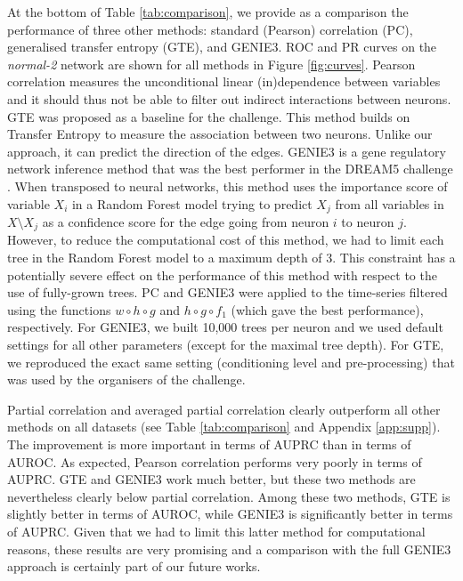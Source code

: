 \documentclass[wcp]{jmlr}
\begin{document}
At the bottom of Table \ref{tab:comparison}, we provide as a comparison the
performance of three other methods: standard (Pearson) correlation (PC),
generalised transfer entropy (GTE), and GENIE3. ROC and PR curves on the
\textit{normal-2} network are shown for all methods in Figure
\ref{fig:curves}. Pearson correlation measures the unconditional linear
(in)dependence between variables and it should thus not be able to filter out
indirect interactions between neurons. GTE \citep{stetter2012model} was
proposed as a baseline for the challenge. This method builds on Transfer
Entropy to measure the association between two neurons. Unlike our approach, it
can predict the direction of the edges. GENIE3 \citep{huynhthu2010inferring} is
a gene regulatory network inference method that was the best performer in the
DREAM5 challenge \citep{marbach2012}. When transposed to neural networks, this
method uses the importance score of variable $X_i$ in a Random Forest model trying to
predict $X_j$ from all variables in $X\setminus X_j$ as a confidence score for the edge going from neuron $i$ to neuron
$j$. However, to reduce the
computational cost of this method, we had to limit each tree in the
Random Forest model to a maximum depth of 3. This constraint has a potentially
severe effect on the performance of this method with respect to the use of
fully-grown trees. PC and GENIE3 were applied to the time-series filtered using the functions $w\circ h\circ g$ and $h\circ g\circ f_1$ (which
gave the best performance), respectively. For GENIE3, we built 10,000 trees per neuron and we
used default settings for all other parameters (except for the maximal tree
depth). For GTE, we reproduced the exact same setting (conditioning level and
pre-processing) that was used by the organisers of the challenge.


Partial correlation and averaged partial correlation clearly outperform all
other methods on all datasets (see Table \ref{tab:comparison} and Appendix \ref{app:supp}). The
improvement is more important in terms of AUPRC than in terms of AUROC. As
expected, Pearson correlation performs very poorly in terms of AUPRC. GTE and
GENIE3 work much better, but these two methods are nevertheless clearly below
partial correlation. Among these two methods, GTE is slightly better in terms
of AUROC, while GENIE3 is significantly better in terms of AUPRC. Given that we
had to limit this latter method for computational reasons, these results are
very promising and a comparison with the full GENIE3 approach is certainly part
of our future works.
\end{document}
